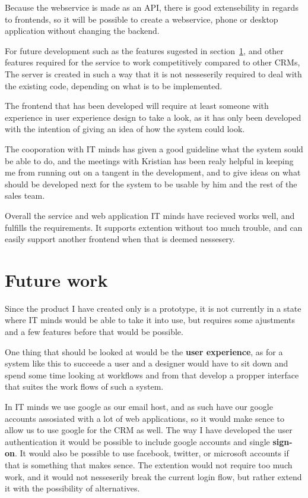 Because the webservice is made as an API, there is good extensebility in regards
to frontends, so it will be possible to create a webservice, phone or desktop
application without changing the backend.

For future development such as the features sugested in
section~\ref{sec:future_work}, and other features required for the service to
work competitively compared to other CRMs, The server is created in such a way
that it is not nesseserily required to deal with the existing code, depending on
what is to be implemented.

The frontend that has been developed will require at least someone with
experience in user experience design to take a look, as it has only been
developed with the intention of giving an idea of how the system could look.

The cooporation with IT minds has given a good guideline what the system sould
be able to do, and the meetings with Kristian has been realy helpful in keeping
me from running out on a tangent in the development, and to give ideas on what
should be developed next for the system to be usable by him and the rest of the
sales team.

Overall the service and web application IT minds have recieved works well, and
fulfills the requirements. It supports extention without too much trouble, and
can easily support another frontend when that is deemed nessesery.

\section{Future work}
\label{sec:future_work}
Since the product I have created only is a prototype, it is not currently in a
state where IT minds would be able to take it into use, but requires some
ajustments and a few features before that would be possible.

One thing that should be looked at would be the \textbf{user experience}, as for a system
like this to succeede a user and a designer would have to sit down and spend
some time looking at workflows and from that develop a propper interface that
suites the work flows of such a system.

In IT minds we use google as our email host, and as such have our google
accounts assosiated with a lot of web applications, so it would make sence to
allow us to use google for the CRM as well. The way I have developed the user
authentication it would be possible to include google accounts and single
\textbf{sign-on}. It would also be possible to use facebook, twitter, or microsoft accounts if that
is something that makes sence. The extention would not require too much work,
and it would not nesseserily break the current login flow, but rather extend it
with the possibility of alternatives.

